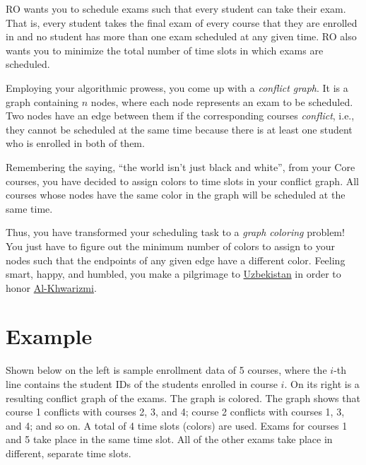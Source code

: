 \documentclass[a4paper]{exam}
\begin{document}
RO wants you to schedule exams such that every student can take their exam. That is, every student takes the final exam of every course that they are enrolled in and no student has more than one exam scheduled at any given time. RO also wants you to minimize the total number of time slots in which exams are scheduled.

Employing your algorithmic prowess, you come up with a \textit{conflict graph}. It is a graph containing $n$ nodes, where each node represents an exam to be scheduled. Two nodes have an edge between them if the corresponding courses \textit{conflict}, i.e., they cannot be scheduled at the same time because there is at least one student who is enrolled in both of them.

Remembering the saying, ``the world isn't just black and white'', from your Core courses, you have decided to assign colors to time slots in your conflict graph. All courses whose nodes have the same color in the graph will be scheduled at the same time.

Thus, you have transformed your scheduling task to a \textit{graph coloring} problem! You just have to figure out the minimum number of colors to assign to your nodes such that the endpoints of any given edge have a different color. Feeling smart, happy, and humbled, you make a pilgrimage to \href{https://en.wikipedia.org/wiki/Al-Khwarizmi_Complex}{Uzbekistan} in order to honor \href{https://www.openculture.com/2022/04/why-algorithms-are-called-algorithms.html}{Al-Khwarizmi}.


\section*{Example}

Shown below on the left is sample enrollment data of 5 courses, where the $i$-th line contains the student IDs of the students enrolled in course $i$. On its right is a resulting conflict graph of the exams. The graph is colored. The graph shows that course 1 conflicts with courses 2, 3, and 4; course 2 conflicts with courses 1, 3, and 4; and so on. A total of 4 time slots (colors) are used. Exams for courses 1 and 5 take place in the same time slot. All of the other exams take place in different, separate time slots.
\bigskip
\end{document}
